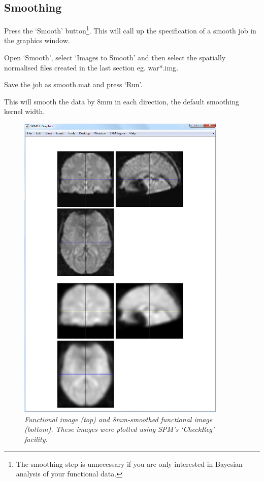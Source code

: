 \subsection{Smoothing}

Press the `Smooth' button\footnote{The smoothing step is unnecessary if you are only interested in Bayesian analysis of your functional data.}. This will call up the specification of a smooth job in the graphics window.

\bi
\item{Open `Smooth', select `Images to Smooth' and then select the spatially normalised files created in the last section eg. {\sf war*.img}. }
\item{Save the job as {\sf smooth.mat} and press `Run'.}
\ei

This will smooth the data by 8mm in each direction, the default smoothing kernel width.

\begin{figure}
\begin{center}
\includegraphics[width=100mm]{faces/smooth}
\caption{\em Functional image (top) and 8mm-smoothed functional image (bottom). These images were plotted using SPM's `CheckReg' facility. \label{face_smooth}}
\end{center}
\end{figure}

